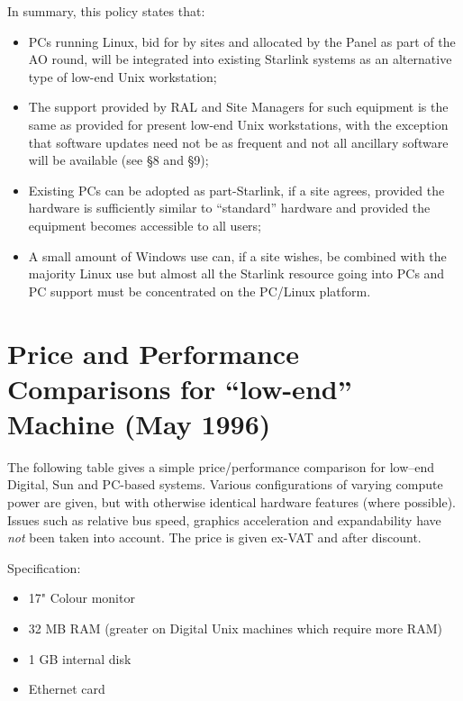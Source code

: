 \documentclass[twoside,11pt]{article}
\begin{document}
In summary, this policy states that:
\begin{itemize}
\item   PCs running Linux, bid for by sites and allocated by the Panel
        as part of the
        AO round, will be integrated into existing Starlink systems as an
        alternative type of low-end Unix workstation;
\item   The support provided by RAL and Site Managers for such equipment
        is the same as provided for present low-end Unix workstations, with
        the exception that software updates need not be as frequent and
        not all ancillary software will be available (see \S 8 and \S 9);
\item   Existing PCs can be adopted as part-Starlink, if a site
        agrees, provided the hardware is sufficiently similar to
       ``standard'' hardware and provided the equipment becomes
        accessible to all users;
\item   A small amount of Windows use can, if a site wishes, be
        combined with the majority Linux use but almost all the Starlink
        resource going into PCs and PC support must be concentrated on the
        PC/Linux platform.
\end{itemize}

\newpage

\appendix

\section{Price and Performance Comparisons for ``low-end'' Machine (May 1996)}

The following table gives a simple price/performance comparison for
low--end Digital, Sun and PC-based systems. Various configurations of
varying compute power are given, but with otherwise identical hardware
features (where possible). Issues such as relative bus speed,
graphics acceleration and expandability have {\em not} been taken into
account. The price is given ex-VAT and after discount.

Specification:
\begin{itemize}
\item 17" Colour monitor
\item 32 MB RAM (greater on Digital Unix machines which require more RAM)
\item 1 GB internal disk
\item Ethernet card
\end{itemize}
\end{document}
